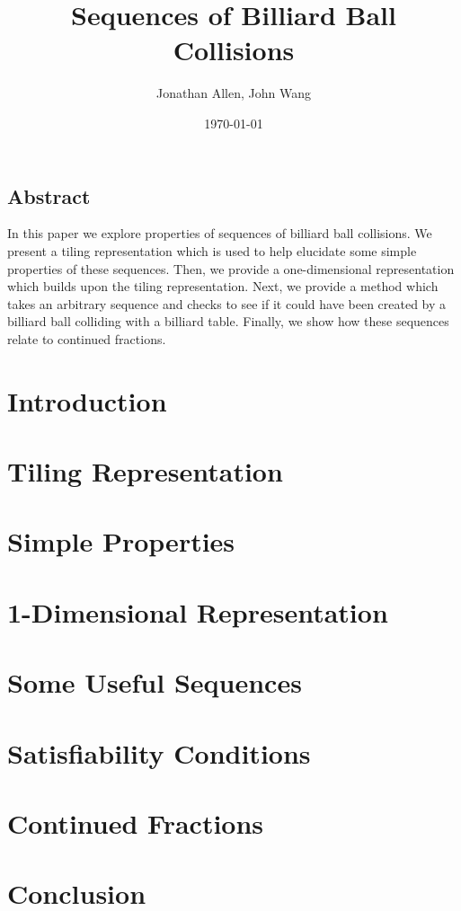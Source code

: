 \documentclass[12pt]{amsart}   %
\begin{document}
\graphicspath{ {figures/} }

\title[Billiards]{Sequences of Billiard Ball Collisions}

\author{Jonathan Allen, John Wang}
\date{\today}

\maketitle

\subsection*{Abstract}

In this paper we explore properties of sequences of billiard ball collisions. We present a tiling representation which is used to help elucidate some simple properties of these sequences. Then, we provide a one-dimensional representation which builds upon the tiling representation. Next, we provide a method which takes an arbitrary sequence and checks to see if it could have been created by a billiard ball colliding with a billiard table. Finally, we show how these sequences relate to continued fractions.

\section{Introduction}


\section{Tiling Representation}


\section{Simple Properties}


\section{1-Dimensional Representation}


\section{Some Useful Sequences}


\section{Satisfiability Conditions}


\section{Continued Fractions}


\section{Conclusion}



\end{document}
